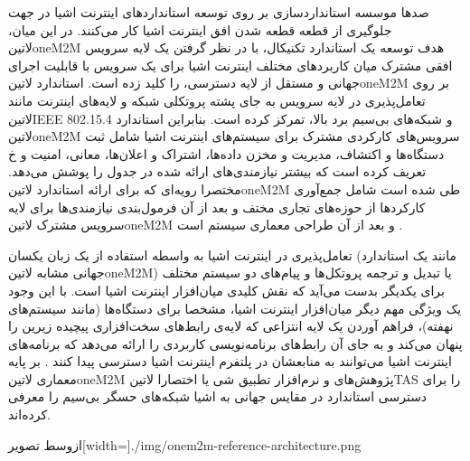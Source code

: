 صدها موسسه استانداردسازی بر روی توسعه استانداردهای اینترنت اشیا در جهت جلوگیری از قطعه قطعه شدن افق اینترنت اشیا کار می‌کنند.
در این میان، ‌لاتین{oneM2M} هدف توسعه یک استاندارد تکنیکال، با در نظر گرفتن یک لایه سرویس افقی مشترک میان کاربردهای مختلف اینترنت اشیا برای
یک سرویس با قابلیت اجرای جهانی و مستقل از لایه دسترسی، را کلید زده است.
استاندارد ‌لاتین{oneM2M} بر روی تعامل‌پذیری در لایه سرویس به جای پشته پروتکلی شبکه و لایه‌های اینترنت مانند ‌لاتین{IEEE 802.15.4} و شبکه‌های بی‌سیم برد بالا، تمرکز کرده است.
بنابراین استاندارد ‌لاتین{oneM2M} سرویس‌های کارکردی مشترک برای سیستم‌های اینترنت اشیا شامل ثبت دستگاه‌ها و اکتشاف، مدیریت و مخزن داده‌ها، اشتراک و اعلان‌ها، معانی، امنیت و ‌خ
تعریف کرده است که بیشتر نیازمندی‌های ارائه شده در جدول  را پوشش می‌دهد.
مختصرا رویه‌ای که برای ارائه استاندارد ‌لاتین{oneM2M} طی شده است شامل جمع‌آوری کارکردها از حوزه‌های تجاری مختف و بعد از آن
فرمول‌بندی نیازمندی‌ها برای لایه سرویس مشترک ‌لاتین{oneM2M} و بعد از آن طراحی معماری سیستم است
 .

تعامل‌پذیری در اینترنت اشیا به واسطه استفاده از یک زبان یکسان (مانند یک استاندارد جهانی مشابه ‌لاتین{oneM2M})
یا تبدیل و ترجمه پروتکل‌ها و پیام‌های دو سیستم مختلف برای یکدیگر بدست می‌آید که نقش کلیدی میان‌افزار اینترنت اشیا است.
با این وجود یک ویژگی مهم دیگر میان‌افزار اینترنت اشیا، مشخصا برای دستگاه‌ها (مانند سیستم‌های نهفته)، فراهم آوردن یک لایه انتزاعی که لایه‌ی رابط‌های سخت‌افزاری پیچیده زیرین را پنهان می‌کند
و به جای آن رابط‌های برنامه‌نویسی کاربردی را ارائه می‌دهد که برنامه‌های اینترنت اشیا می‌توانند به منابعشان در پلتفرم اینترنت اشیا دسترسی پیدا کنند
.
بر پایه معماری ‌لاتین{oneM2M} پژوهش‌های  و  نرم‌افزار تطبیق شی یا اختصارا ‌لاتین{TAS} را برای دسترسی استاندارد در مقایس جهانی به اشیا شبکه‌های حسگر بی‌سیم
را معرفی کرده‌اند.

‌ازوسط
‌تصویر[width=\textwidth]{./img/onem2m-reference-architecture.png}

